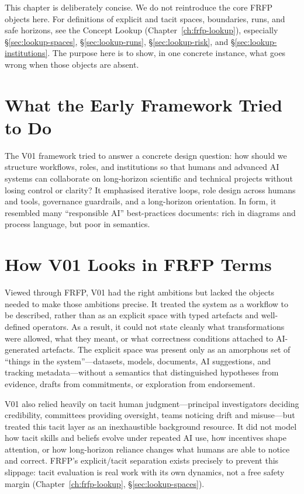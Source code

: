 This chapter is deliberately concise. We do not reintroduce the core FRFP objects here. For definitions of explicit and tacit spaces, boundaries, runs, and safe horizons, see the Concept Lookup (Chapter~\ref{ch:frfp-lookup}), especially \S\ref{sec:lookup-spaces}, \S\ref{sec:lookup-runs}, \S\ref{sec:lookup-risk}, and \S\ref{sec:lookup-institutions}. The purpose here is to show, in one concrete instance, what goes wrong when those objects are absent.

\section{What the Early Framework Tried to Do}

The V01 framework tried to answer a concrete design question: how should we structure workflows, roles, and institutions so that humans and advanced AI systems can collaborate on long-horizon scientific and technical projects without losing control or clarity? It emphasised iterative loops, role design across humans and tools, governance guardrails, and a long-horizon orientation. In form, it resembled many ``responsible AI'' best-practices documents: rich in diagrams and process language, but poor in semantics.

\section{How V01 Looks in FRFP Terms}

Viewed through FRFP, V01 had the right ambitions but lacked the objects needed to make those ambitions precise. It treated the system as a workflow to be described, rather than as an explicit space with typed artefacts and well-defined operators. As a result, it could not state cleanly what transformations were allowed, what they meant, or what correctness conditions attached to AI-generated artefacts. The explicit space was present only as an amorphous set of ``things in the system''---datasets, models, documents, AI suggestions, and tracking metadata---without a semantics that distinguished hypotheses from evidence, drafts from commitments, or exploration from endorsement.

V01 also relied heavily on tacit human judgment---principal investigators deciding credibility, committees providing oversight, teams noticing drift and misuse---but treated this tacit layer as an inexhaustible background resource. It did not model how tacit skills and beliefs evolve under repeated AI use, how incentives shape attention, or how long-horizon reliance changes what humans are able to notice and correct. FRFP’s explicit/tacit separation exists precisely to prevent this slippage: tacit evaluation is real work with its own dynamics, not a free safety margin (Chapter~\ref{ch:frfp-lookup}, \S\ref{sec:lookup-spaces}).

